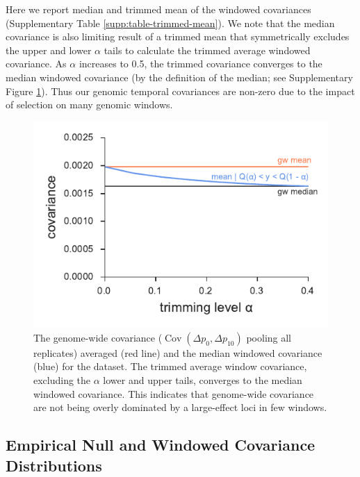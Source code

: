 \documentclass[11pt]{article}
\DeclareMathOperator{\cov}{Cov}
\begin{document}
Here we report median and trimmed mean of the windowed covariances
(Supplementary Table \ref{supp:table-trimmed-mean}). We note that the median
covariance is also limiting result of a trimmed mean that symmetrically
excludes the upper and lower $\alpha$ tails to calculate the trimmed average
windowed covariance. As $\alpha$ increases to 0.5, the trimmed covariance
converges to the median windowed covariance (by the definition of the median;
see Supplementary Figure \ref{suppfig:barghi-trimmed-mean}). Thus our genomic
temporal covariances are non-zero due to the impact of selection on many
genomic windows.  


\begin{figure}[!ht]
  \centering
  \includegraphics[]{figures/barghi-trimmed-mean.pdf}

  \caption{The genome-wide covariance ($\cov(\Delta p_0, \Delta p_10)$ pooling
    all replicates) averaged (red line) and the median windowed covariance
    (blue) for the \textcite{Barghi2019-qy} dataset. The trimmed average window
    covariance, excluding the $\alpha$ lower and upper tails, converges to the
     median windowed covariance. This indicates that genome-wide covariance are
     not being overly dominated by a large-effect loci in few windows.}

  \label{suppfig:barghi-trimmed-mean}
\end{figure}



\clearpage

\subsection{\textcite{Barghi2019-qy} Empirical Null and Windowed Covariance Distributions}
\end{document}
